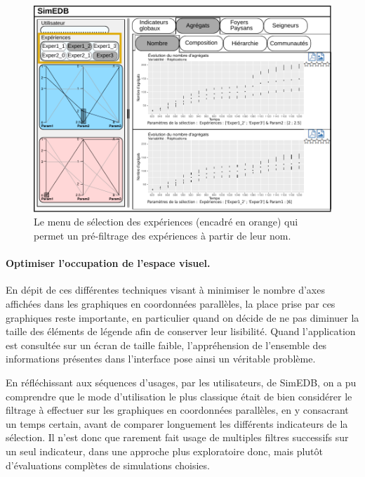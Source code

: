 \begin{figure}[H]
	\centering
	\includegraphics[width=\linewidth]{img/mockup_SimEDB_selectinput.pdf}
	\caption{Le menu de sélection des expériences (encadré en orange) qui permet un pré-filtrage des expériences à partir de leur nom.}
	\label{fig:simedb-prefilter}
\end{figure}

\paragraph{Optimiser l'occupation de l'espace visuel.}\label{par:simedb-resize-parcoords}

En dépit de ces différentes techniques visant à minimiser le nombre d'axes affichées dans les graphiques en coordonnées parallèles, la place prise par ces graphiques reste importante, en particulier quand on décide de ne pas diminuer la taille des éléments de légende afin de conserver leur lisibilité.
Quand l'application est consultée sur un écran de taille faible, l'appréhension de l'ensemble des informations présentes dans l'interface pose ainsi un véritable problème.

En réfléchissant aux séquences d'usages, par les utilisateurs, de SimEDB, on a pu comprendre que le mode d'utilisation le plus classique était de bien considérer le filtrage à effectuer sur les graphiques en coordonnées parallèles, en y consacrant un temps certain, avant de comparer longuement les différents indicateurs de la sélection.
Il n'est donc que rarement fait usage de multiples filtres successifs sur un seul indicateur, dans une approche plus exploratoire donc, mais plutôt d'évaluations complètes de simulations choisies.

